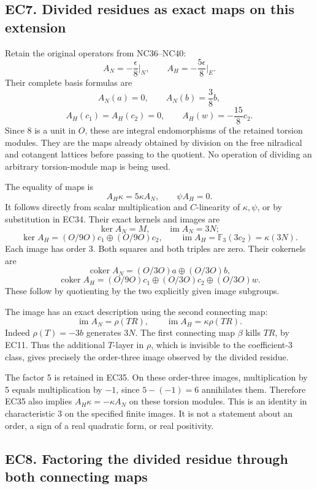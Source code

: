 \documentclass[
  10pt,
]{article}
\begin{document}
\subsection{EC7. Divided residues as exact maps on this
extension}\label{ec7.-divided-residues-as-exact-maps-on-this-extension}

Retain the original operators from NC36--NC40: \[
A_N=-\frac{\epsilon}{8}\Big|_N,\qquad
A_H=-\frac{5\epsilon}{8}\Big|_E.
\tag{EC33}
\] Their complete basis formulas are \[
A_N(a)=0,\qquad A_N(b)=\frac38b,
\] \[
A_H(c_1)=A_H(c_2)=0,\qquad
A_H(w)=-\frac{15}{8}c_2.
\tag{EC34}
\] Since 8 is a unit in \(O\), these are integral endomorphisms of the
retained torsion modules. They are the maps already obtained by division
on the free nilradical and cotangent lattices before passing to the
quotient. No operation of dividing an arbitrary torsion-module map is
being used.

The equality of maps is \[
A_H\kappa=5\kappa A_N,\qquad\psi A_H=0.
\tag{EC35}
\] It follows directly from scalar multiplication and \(C\)-linearity of
\(\kappa,\psi\), or by substitution in EC34. Their exact kernels and
images are \[
\ker A_N=M,\qquad\operatorname{im}A_N=3N;
\] \[
\ker A_H=(O/9O)c_1\oplus(O/9O)c_2,\qquad
\operatorname{im}A_H=\mathbb F_3(3c_2)=\kappa(3N).
\tag{EC36}
\] Each image has order 3. Both squares and both triples are zero. Their
cokernels are \[
\operatorname{coker}A_N=(O/3O)a\oplus(O/3O)b,
\] \[
\operatorname{coker}A_H=(O/9O)c_1\oplus
(O/3O)c_2\oplus(O/3O)w.
\] These follow by quotienting by the two explicitly given image
subgroups.

The image has an exact description using the second connecting map: \[
\operatorname{im}A_N=\rho(TR),\qquad
\operatorname{im}A_H=\kappa\rho(TR).
\tag{EC37}
\] Indeed \(\rho(T)=-3b\) generates \(3N\). The first connecting map
\(\beta\) kills \(TR\), by EC11. Thus the additional \(T\)-layer in
\(\rho\), which is invisible to the coefficient-3 class, gives precisely
the order-three image observed by the divided residue.

The factor 5 is retained in EC35. On these order-three images,
multiplication by 5 equals multiplication by \(-1\), since \(5-(-1)=6\)
annihilates them. Therefore EC35 also implies \(A_H\kappa=-\kappa A_N\)
on these torsion modules. This is an identity in characteristic 3 on the
specified finite images. It is not a statement about an order, a sign of
a real quadratic form, or real positivity.

\subsection{EC8. Factoring the divided residue through both connecting
maps}\label{ec8.-factoring-the-divided-residue-through-both-connecting-maps}
\end{document}

